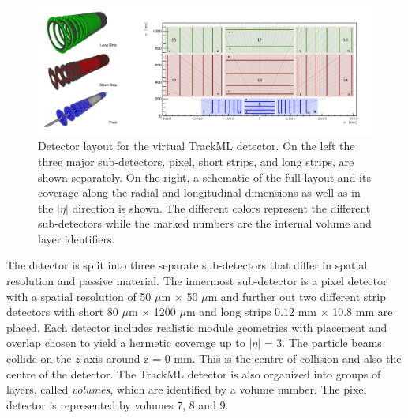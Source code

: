 \begin{figure}[!htbp]
  \centering
  \includegraphics[width=\textwidth]{images/3-track-reconstruction/trackml-detector.png}
  \caption{
    Detector layout for the virtual TrackML detector. On the left the three major sub-detectors, pixel, short strips, and long strips, are shown separately. On the right, a schematic of the full layout and its coverage along the radial and longitudinal dimensions as well as in the $ \lvert \eta \rvert$ direction is shown. The different colors represent the different sub-detectors while the marked numbers are the internal volume and layer identifiers.
  }
  \label{fig:trackml-detector-image}
\end{figure}



The detector is split into three separate sub-detectors that differ in spatial resolution and passive material. The innermost sub-detector is a pixel detector with a spatial resolution of 50 $\mu$m $\times$ 50 $\mu$m and further out two different strip detectors with short 80 $\mu$m × 1200 $\mu$m and long strips 0.12 mm $\times$ 10.8 mm are placed. Each detector includes realistic module geometries with placement and overlap chosen to yield a hermetic coverage up to $\lvert \eta \rvert$ = 3. The particle beams collide on the $z$-axis around z = 0 mm. This is the centre of collision and also the centre of the detector. The TrackML detector is also organized into groups of layers, called \textit{volumes}, which are identified by a volume number. The pixel detector is represented by volumes 7, 8 and 9.





